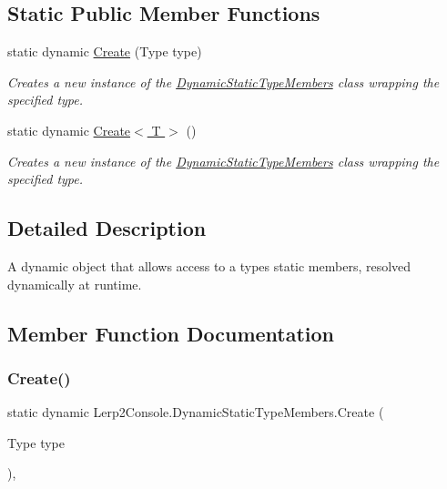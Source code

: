 \subsection*{Static Public Member Functions}
\begin{DoxyCompactItemize}
\item 
static dynamic \hyperlink{class_lerp2_console_1_1_dynamic_static_type_members_a28487e53e21f9e2ea239255fc75585d2}{Create} (Type type)
\begin{DoxyCompactList}\small\item\em Creates a new instance of the \hyperlink{class_lerp2_console_1_1_dynamic_static_type_members}{Dynamic\+Static\+Type\+Members} class wrapping the specified type. \end{DoxyCompactList}\item 
static dynamic \hyperlink{class_lerp2_console_1_1_dynamic_static_type_members_af3790b4348441f2edeb40dbfe7207af5}{Create$<$ T $>$} ()
\begin{DoxyCompactList}\small\item\em Creates a new instance of the \hyperlink{class_lerp2_console_1_1_dynamic_static_type_members}{Dynamic\+Static\+Type\+Members} class wrapping the specified type. \end{DoxyCompactList}\end{DoxyCompactItemize}


\subsection{Detailed Description}
A dynamic object that allows access to a type\textquotesingle{}s static members, resolved dynamically at runtime. 



\subsection{Member Function Documentation}
\mbox{\label{class_lerp2_console_1_1_dynamic_static_type_members_a28487e53e21f9e2ea239255fc75585d2}} 
\subsubsection{\texorpdfstring{Create()}{Create()}}
{\footnotesize\ttfamily static dynamic Lerp2\+Console.\+Dynamic\+Static\+Type\+Members.\+Create (\begin{DoxyParamCaption}\item[{Type}]{type }\end{DoxyParamCaption})\hspace{0.3cm}{\ttfamily [inline]}, {\ttfamily [static]}}



